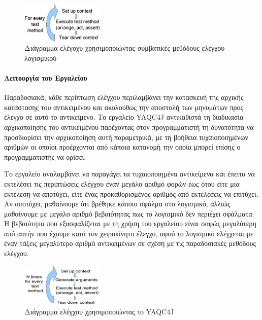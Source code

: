 \documentclass[12pt]{article}
\begin{document}
\begin{figure}
\centering
    \includegraphics[width=0.35\textwidth]{conventional_testing.png}
    \caption{Διάγραμμα ελέγοχυ χρησιμοποιώντας συμβατικές μεθόδους ελέγχου λογισμικού}
    \label{fig:conventional_testing}
\end{figure}

\paragraph{Λειτουργία του Εργαλείου}

Παραδοσιακά, κάθε περίπτωση ελέγχου περιλαμβάνει την κατασκευή της αρχικής κατάστασης του αντικειμένου και ακολούθως την αποστολή των μηνυμάτων προς έλεγχο σε αυτό το αντικείμενο. Το εργαλείο YAQC4J αντικαθιστά τη διαδικασία αρχικοποίησης του αντικειμένου παρέχοντας στον προγραμματιστή τη δυνατότητα να προσδιορίσει την αρχικοποίηση αυτή παραμετρικά, με τη βοήθεια τυχαιοποιημένων αριθμών οι οποίοι προέρχονται από κάποια κατανομή την οποία μπορεί επίσης ο προγραμματιστής να ορίσει.

\par Το εργαλείο αναλαμβάνει να παραγάγει τα τυχαιοποιημένα αντικείμενα και έπειτα να εκτελέσει τις περιπτώσεις ελέγχου έναν μεγάλο αριθμό φορών έως ότου είτε μια εκτέλεση να αποτύχει, είτε ένας προκαθορισμένος αριθμός από εκτελέσεις να επιτύχει. Αν αποτύχει, μαθαίνουμε ότι βρέθηκε κάποιο σφάλμα στο λογισμικό, αλλιώς μαθαίνουμε με μεγάλο αριθμό βεβαιότητας πως το λογισμικό δεν περιέχει σφάλματα. Η βεβαιότητα που εξασφαλίζεται με τη χρήση του εργαλείου είναι σαφώς μεγαλύτερη από αυτήν που έχουμε κατά τον χειροκίνητο έλεγχο, αφού το λογισμικό ελέγχεται με έναν τάξεις μεγαλύτερο αριθμό αντικειμένων σε σχέση με τις παραδοσιακές μεθόδους ελέγχου.

\begin{figure}
\centering
    \includegraphics[width=0.35\textwidth]{testing_with_yaqc4j.png}
    \caption{Διάγραμμα ελέγχου χρησιμοποιώντας το YAQC4J}
    \label{fig:yaqc4j_testing}
\end{figure}
\end{document}
